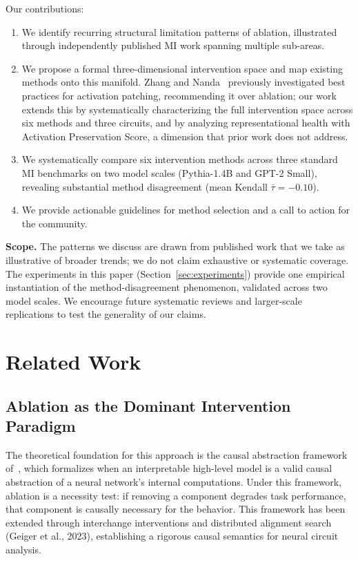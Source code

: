 \documentclass[pdflatex,sn-mathphys-num]{sn-jnl}
\begin{document}
Our contributions:
\begin{enumerate}
    \item We identify recurring structural limitation patterns of ablation, illustrated through independently published MI work spanning multiple sub-areas.
    \item We propose a formal three-dimensional intervention space and map existing methods onto this manifold. Zhang and Nanda~\cite{ZhangNanda2023} previously investigated best practices for activation patching, recommending it over ablation; our work extends this by systematically characterizing the full intervention space across six methods and three circuits, and by analyzing representational health with Activation Preservation Score, a dimension that prior work does not address.
    \item We systematically compare six intervention methods across three standard MI benchmarks on two model scales (Pythia-1.4B and GPT-2 Small), revealing substantial method disagreement (mean Kendall $\bar\tau = -0.10$).
    \item We provide actionable guidelines for method selection and a call to action for the community.
\end{enumerate}

\textbf{Scope.} The patterns we discuss are drawn from published work that we take as illustrative of broader trends; we do not claim exhaustive or systematic coverage. The experiments in this paper (Section~\ref{sec:experiments}) provide one empirical instantiation of the method-disagreement phenomenon, validated across two model scales. We encourage future systematic reviews and larger-scale replications to test the generality of our claims.

\section{Related Work}
\label{sec:related}

\subsection{Ablation as the Dominant Intervention Paradigm}

The theoretical foundation for this approach is the causal abstraction framework of~\cite{Geiger2021}, which formalizes when an interpretable high-level model is a valid causal abstraction of a neural network's internal computations. Under this framework, ablation is a necessity test: if removing a component degrades task performance, that component is causally necessary for the behavior. This framework has been extended through interchange interventions and distributed alignment search (Geiger et al., 2023), establishing a rigorous causal semantics for neural circuit analysis.
\end{document}
